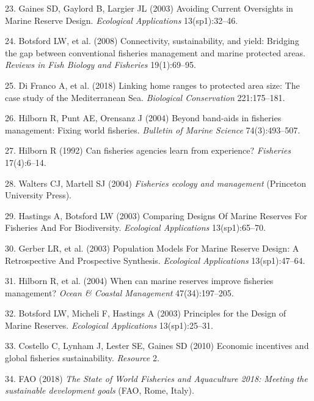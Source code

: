 \documentclass[9pt,twocolumn,twoside,lineno]{pnas-new}
\begin{document}
\leavevmode\hypertarget{ref-gaines2003}{}%
23. Gaines SD, Gaylord B, Largier JL (2003) Avoiding Current Oversights
in Marine Reserve Design. \emph{Ecological Applications} 13(sp1):32--46.

\leavevmode\hypertarget{ref-botsford2008}{}%
24. Botsford LW, et al. (2008) Connectivity, sustainability, and yield:
Bridging the gap between conventional fisheries management and marine
protected areas. \emph{Reviews in Fish Biology and Fisheries}
19(1):69--95.

\leavevmode\hypertarget{ref-difranco2018}{}%
25. Di Franco A, et al. (2018) Linking home ranges to protected area
size: The case study of the Mediterranean Sea. \emph{Biological
Conservation} 221:175--181.

\leavevmode\hypertarget{ref-hilborn2004}{}%
26. Hilborn R, Punt AE, Orensanz J (2004) Beyond band-aids in fisheries
management: Fixing world fisheries. \emph{Bulletin of Marine Science}
74(3):493--507.

\leavevmode\hypertarget{ref-hilborn1992}{}%
27. Hilborn R (1992) Can fisheries agencies learn from experience?
\emph{Fisheries} 17(4):6--14.

\leavevmode\hypertarget{ref-walters2004}{}%
28. Walters CJ, Martell SJ (2004) \emph{Fisheries ecology and
management} (Princeton University Press).

\leavevmode\hypertarget{ref-hastings2003}{}%
29. Hastings A, Botsford LW (2003) Comparing Designs Of Marine Reserves
For Fisheries And For Biodiversity. \emph{Ecological Applications}
13(sp1):65--70.

\leavevmode\hypertarget{ref-gerber2003}{}%
30. Gerber LR, et al. (2003) Population Models For Marine Reserve
Design: A Retrospective And Prospective Synthesis. \emph{Ecological
Applications} 13(sp1):47--64.

\leavevmode\hypertarget{ref-hilborn2004a}{}%
31. Hilborn R, et al. (2004) When can marine reserves improve fisheries
management? \emph{Ocean \& Coastal Management} 47(34):197--205.

\leavevmode\hypertarget{ref-botsford2003}{}%
32. Botsford LW, Micheli F, Hastings A (2003) Principles for the Design
of Marine Reserves. \emph{Ecological Applications} 13(sp1):25--31.

\leavevmode\hypertarget{ref-costello2010}{}%
33. Costello C, Lynham J, Lester SE, Gaines SD (2010) Economic
incentives and global fisheries sustainability. \emph{Resource} 2.

\leavevmode\hypertarget{ref-fao2018}{}%
34. FAO (2018) \emph{The State of World Fisheries and Aquaculture 2018:
Meeting the sustainable development goals} (FAO, Rome, Italy).
\end{document}
